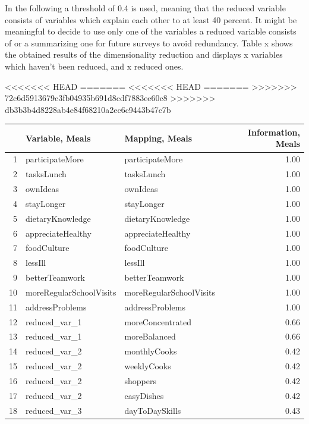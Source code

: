 \documentclass[12pt, a4paper, titlepage]{article}\usepackage[]{graphicx}\usepackage[]{color}
\begin{document}
In the following a threshold of 0.4 is used, meaning that the reduced variable consists of variables which explain each other to at least 40 percent. It might be meaningful to decide to use only one of the variables a reduced variable consists of or a summarizing one for future surveys to avoid redundancy. Table x shows the obtained results of the dimensionality reduction and displays x variables which haven't been reduced, and x reduced ones.    

<<<<<<< HEAD
=======
<<<<<<< HEAD
=======
>>>>>>> 72c6d5913679c3fb04935b691d8cdf7883ee60c8
>>>>>>> db3b3b4d8228ab4e84f68210a2ec6c9443b47c7b
\begin{table}[ht]
\centering
\begin{tabular}{rllr}
  \hline
 & Variable, Meals & Mapping, Meals & Information, Meals \\ 
  \hline
1 & participateMore & participateMore & 1.00 \\ 
  2 & tasksLunch & tasksLunch & 1.00 \\ 
  3 & ownIdeas & ownIdeas & 1.00 \\ 
  4 & stayLonger & stayLonger & 1.00 \\ 
  5 & dietaryKnowledge & dietaryKnowledge & 1.00 \\ 
  6 & appreciateHealthy & appreciateHealthy & 1.00 \\ 
  7 & foodCulture & foodCulture & 1.00 \\ 
  8 & lessIll & lessIll & 1.00 \\ 
  9 & betterTeamwork & betterTeamwork & 1.00 \\ 
  10 & moreRegularSchoolVisits & moreRegularSchoolVisits & 1.00 \\ 
  11 & addressProblems & addressProblems & 1.00 \\ 
  12 & reduced\_var\_1 & moreConcentrated & 0.66 \\ 
  13 & reduced\_var\_1 & moreBalanced & 0.66 \\ 
  14 & reduced\_var\_2 & monthlyCooks & 0.42 \\ 
  15 & reduced\_var\_2 & weeklyCooks & 0.42 \\ 
  16 & reduced\_var\_2 & shoppers & 0.42 \\ 
  17 & reduced\_var\_2 & easyDishes & 0.42 \\ 
  18 & reduced\_var\_3 & dayToDaySkills & 0.43 \\ 

\end{tabular}
\end{table}
\end{document}
